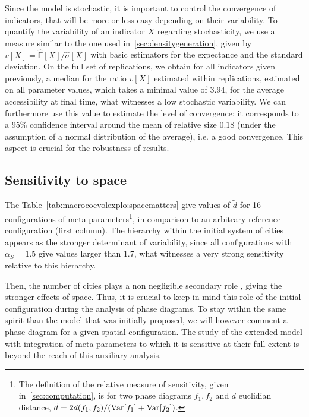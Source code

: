 Since the model is stochastic, it is important to control the convergence of indicators, that will be more or less easy depending on their variability. To quantify the variability of an indicator $X$ regarding stochasticity, we use a measure similar to the one used in~\ref{sec:densitygeneration}, given by $v\left[X\right] = \hat{\mathbb{E}}\left[X\right]/\hat{\sigma}\left[X\right]$ with basic estimators for the expectance and the standard deviation. On the full set of replications, we obtain for all indicators given previously, a median for the ratio $v\left[X\right]$ estimated within replications, estimated on all parameter values, which takes a minimal value of $3.94$, for the average accessibility at final time, what witnesses a low stochastic variability. We can furthermore use this value to estimate the level of convergence: it corresponds to a 95\% confidence interval around the mean of relative size $0.18$ (under the assumption of a normal distribution of the average), i.e. a good convergence. This aspect is crucial for the robustness of results.


\subsection{Sensitivity to space}

The Table~\ref{tab:macrocoevolexplo:spacematters} give values of $\tilde{d}$ for 16 configurations of meta-parameters\footnote{The definition of the relative measure of sensitivity, given in~\ref{sec:computation}, is for two phase diagrams $f_1,f_2$ and $d$ euclidian distance, $\tilde{d} = 2 d(f_1,f_2)/(\operatorname{Var}\!\left[f_1\right]+\operatorname{Var}\!\left[f_2\right])$.}, in comparison to an arbitrary reference configuration (first column). The hierarchy within the initial system of cities appears as the stronger determinant of variability, since all configurations with $\alpha_S = 1.5$ give values larger than $1.7$, what witnesses a very strong sensitivity relative to this hierarchy.

Then, the number of cities plays a non negligible secondary role , giving the stronger effects of space. Thus, it is crucial to keep in mind this role of the initial configuration during the analysis of phase diagrams. To stay within the same spirit than the model that was initially proposed, we will however comment a phase diagram for a given spatial configuration. The study of the extended model with integration of meta-parameters to which it is sensitive at their full extent is beyond the reach of this auxiliary analysis.





